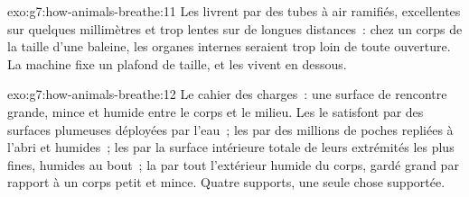 \begin{solution}{exo:g7:how-animals-breathe:11}
Les  livrent par des tubes à air ramifiés, excellentes sur
quelques millimètres et trop lentes sur de longues distances~: chez
un corps de la taille d'une baleine, les organes internes seraient
trop loin de toute ouverture. La machine fixe un plafond de taille,
et les  vivent en dessous.
\end{solution}

\begin{solution}{exo:g7:how-animals-breathe:12}
Le cahier des charges~: une surface de rencontre grande, mince et
humide entre le corps et le milieu. Les  le satisfont par
des surfaces plumeuses déployées par l'eau~; les  par des
millions de poches repliées à l'abri et humides~; les  par
la surface intérieure totale de leurs extrémités les plus fines,
humides au bout~; la  par tout l'extérieur humide du corps,
gardé grand par rapport à un corps petit et mince. Quatre supports,
une seule chose supportée.
\end{solution}

